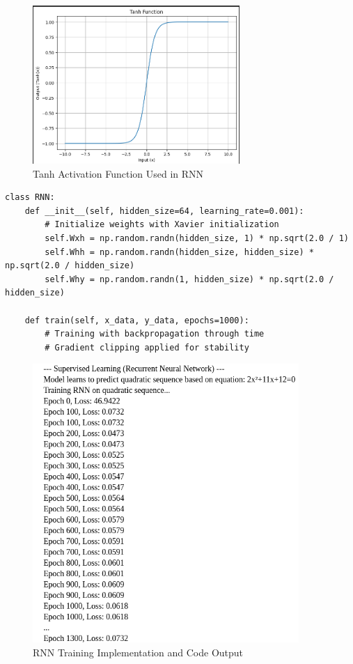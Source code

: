 \documentclass[11pt,a4paper]{article}
\begin{document}
\begin{figure}[H]
\centering
\includegraphics[width=0.7\textwidth]{ss/tanh_func.png}
\caption{Tanh Activation Function Used in RNN}
\end{figure}

\begin{lstlisting}[caption=RNN Class Structure]
class RNN:
    def __init__(self, hidden_size=64, learning_rate=0.001):
        # Initialize weights with Xavier initialization
        self.Wxh = np.random.randn(hidden_size, 1) * np.sqrt(2.0 / 1)
        self.Whh = np.random.randn(hidden_size, hidden_size) * np.sqrt(2.0 / hidden_size)
        self.Why = np.random.randn(1, hidden_size) * np.sqrt(2.0 / hidden_size)
        
    def train(self, x_data, y_data, epochs=1000):
        # Training with backpropagation through time
        # Gradient clipping applied for stability
\end{lstlisting}

\begin{figure}[H]
\centering
\includegraphics[width=0.9\textwidth]{ss/Supervised_Learning_Recurrent_Neural_Network_2.png}
\caption{RNN Training Implementation and Code Output}
\end{figure}
\end{document}
